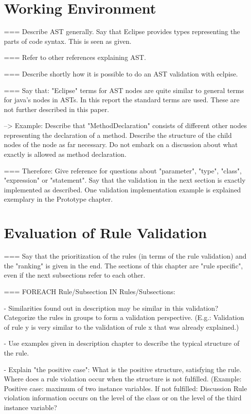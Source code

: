 \section{Working Environment}
=== Describe AST generally. Say that Eclipse provides types representing the parts of code syntax. This is seen as given. 

=== Refer to other references explaining AST.

=== Describe shortly how it is possible to do an AST validation with eclpise. 

=== Say that: "Eclipse" terms for AST nodes are quite similar to general terms for java's nodes in ASTs. In this report the standard terms are used. These are not further described in this paper.

--> Example: Describe that "MethodDeclaration" consists of different other nodes representing the declaration of a method. Describe the structure of the child nodes of the node as far necessary. Do not embark on a discussion about what exactly is allowed as method declaration. 

=== Therefore: Give reference for questions about "parameter", "type", "class", "expression" or "statement".
Say that the validation in the next section is exactly implemented as described. One validation implementation example is explained exemplary in the Prototype chapter.

\section{Evaluation of Rule Validation}
\label{e:evaluation}
=== Say that the prioritization of the rules (in terms of the rule validation) and the "ranking" is given in the end. The sections of this chapter are "rule specific", even if the next subsections refer to each other.

=== FOREACH Rule/Subsection IN Rules/Subsections:

 - Similarities found out in description may be similar in this validation? Categorize the rules in groups to form a validation perspective. (E.g.: Validation of rule y is very similar to the validation of rule x that was already explained.)
  
 - Use examples given in description chapter to describe the typical structure of the rule. 
 
 - Explain "the positive case": What is the positive structure, satisfying the rule. Where does a rule violation occur when the structure is not fulfilled. (Example: Positive case: maximum of two instance variables. If not fulfilled: Discussion Rule violation information occurs on the level of the class or on the level of the third instance variable?
 
